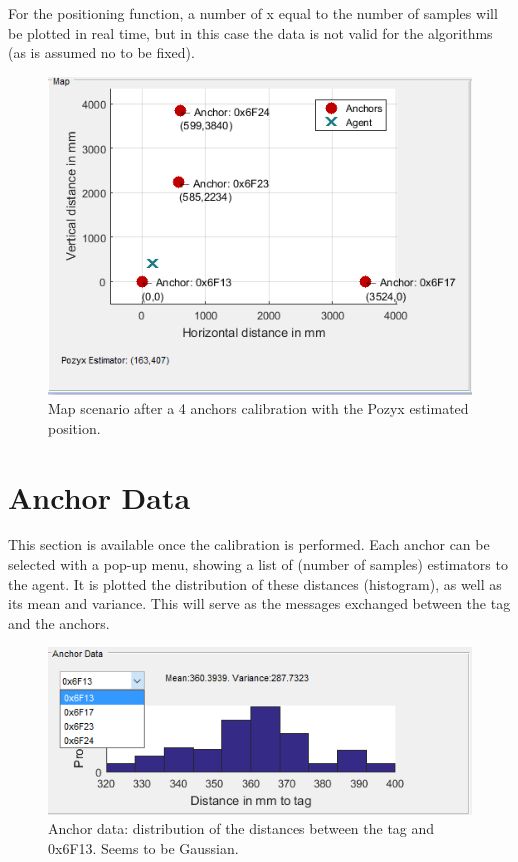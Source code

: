 \documentclass[a4paper, 21pt]{article} %
\begin{document}
For the positioning function, a number of x equal to the number of samples will be plotted in real time, but in this case the data is not valid for the algorithms (as is assumed no to be fixed).

\begin{figure}[H]
\begin{center}
\includegraphics[scale=.8]{fig/ss_map.png}
\end{center}
\caption{Map scenario after a 4 anchors calibration with the Pozyx estimated position.}
\end{figure}

\section{Anchor Data}\label{se:ad}
This section is available once the calibration is performed. Each anchor can be selected with a pop-up menu, showing a list of (number of samples) estimators  to the agent. It is plotted the distribution of these distances (histogram), as well as its mean and variance. This will serve as the messages exchanged between the tag and the anchors.

\begin{figure}[H]
\begin{center}
\includegraphics[scale=.9]{fig/ss_ad.png}
\end{center}
\caption{Anchor data: distribution of the distances between the tag and 0x6F13. Seems to be Gaussian.}
\end{figure}
\end{document}
